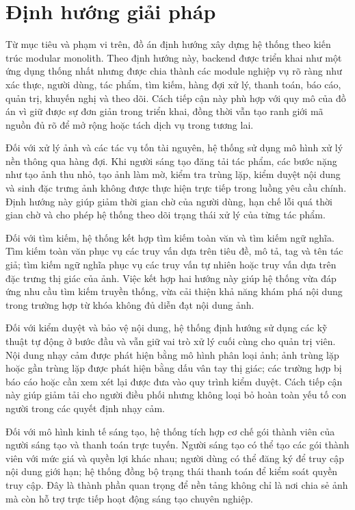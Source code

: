 \section{Định hướng giải pháp}

Từ mục tiêu và phạm vi trên, đồ án định hướng xây dựng hệ thống theo kiến trúc modular monolith. Theo định hướng này, backend được triển khai như một ứng dụng thống nhất nhưng được chia thành các module nghiệp vụ rõ ràng như xác thực, người dùng, tác phẩm, tìm kiếm, hàng đợi xử lý, thanh toán, báo cáo, quản trị, khuyến nghị và theo dõi. Cách tiếp cận này phù hợp với quy mô của đồ án vì giữ được sự đơn giản trong triển khai, đồng thời vẫn tạo ranh giới mã nguồn đủ rõ để mở rộng hoặc tách dịch vụ trong tương lai.

Đối với xử lý ảnh và các tác vụ tốn tài nguyên, hệ thống sử dụng mô hình xử lý nền thông qua hàng đợi. Khi người sáng tạo đăng tải tác phẩm, các bước nặng như tạo ảnh thu nhỏ, tạo ảnh làm mờ, kiểm tra trùng lặp, kiểm duyệt nội dung và sinh đặc trưng ảnh không được thực hiện trực tiếp trong luồng yêu cầu chính. Định hướng này giúp giảm thời gian chờ của người dùng, hạn chế lỗi quá thời gian chờ và cho phép hệ thống theo dõi trạng thái xử lý của từng tác phẩm.

Đối với tìm kiếm, hệ thống kết hợp tìm kiếm toàn văn và tìm kiếm ngữ nghĩa. Tìm kiếm toàn văn phục vụ các truy vấn dựa trên tiêu đề, mô tả, tag và tên tác giả; tìm kiếm ngữ nghĩa phục vụ các truy vấn tự nhiên hoặc truy vấn dựa trên đặc trưng thị giác của ảnh. Việc kết hợp hai hướng này giúp hệ thống vừa đáp ứng nhu cầu tìm kiếm truyền thống, vừa cải thiện khả năng khám phá nội dung trong trường hợp từ khóa không đủ diễn đạt nội dung ảnh.

Đối với kiểm duyệt và bảo vệ nội dung, hệ thống định hướng sử dụng các kỹ thuật tự động ở bước đầu và vẫn giữ vai trò xử lý cuối cùng cho quản trị viên. Nội dung nhạy cảm được phát hiện bằng mô hình phân loại ảnh; ảnh trùng lặp hoặc gần trùng lặp được phát hiện bằng dấu vân tay thị giác; các trường hợp bị báo cáo hoặc cần xem xét lại được đưa vào quy trình kiểm duyệt. Cách tiếp cận này giúp giảm tải cho người điều phối nhưng không loại bỏ hoàn toàn yếu tố con người trong các quyết định nhạy cảm.

Đối với mô hình kinh tế sáng tạo, hệ thống tích hợp cơ chế gói thành viên của người sáng tạo và thanh toán trực tuyến. Người sáng tạo có thể tạo các gói thành viên với mức giá và quyền lợi khác nhau; người dùng có thể đăng ký để truy cập nội dung giới hạn; hệ thống đồng bộ trạng thái thanh toán để kiểm soát quyền truy cập. Đây là thành phần quan trọng để nền tảng không chỉ là nơi chia sẻ ảnh mà còn hỗ trợ trực tiếp hoạt động sáng tạo chuyên nghiệp.


